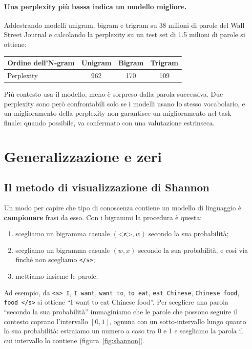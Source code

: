 \paragraph{Una perplexity più bassa indica un modello migliore.} Addestrando modelli unigram, bigram e trigram su 38 milioni di parole del Wall Street Journal e calcolando la perplexity su un test set di 1.5 milioni di parole si ottiene:
\begin{center}
\begin{tabular}{lccc}
\toprule
Ordine dell'N-gram & Unigram & Bigram & Trigram \\
\midrule
Perplexity & 962 & 170 & 109 \\
\bottomrule
\end{tabular}
\end{center}
Più contesto usa il modello, meno è sorpreso dalla parola successiva. Due perplexity sono però confrontabili solo se i modelli usano lo stesso vocabolario, e un miglioramento della perplexity non garantisce un miglioramento nel task finale: quando possibile, va confermato con una valutazione estrinseca.

\section{Generalizzazione e zeri}
\subsection{Il metodo di visualizzazione di Shannon}
Un modo per capire che tipo di conoscenza contiene un modello di linguaggio è \textbf{campionare} frasi da esso. Con i bigrammi la procedura è questa:
\begin{enumerate}
    \item scegliamo un bigramma casuale $(\texttt{<s>}, w)$ secondo la sua probabilità;
    \item scegliamo un bigramma casuale $(w, x)$ secondo la sua probabilità, e così via finché non scegliamo \texttt{</s>};
    \item mettiamo insieme le parole.
\end{enumerate}
Ad esempio, da \texttt{<s> I}, \texttt{I want}, \texttt{want to}, \texttt{to eat}, \texttt{eat Chinese}, \texttt{Chinese food}, \texttt{food </s>} si ottiene \enquote{I want to eat Chinese food}. Per scegliere una parola \enquote{secondo la sua probabilità} immaginiamo che le parole che possono seguire il contesto coprano l'intervallo $[0, 1]$, ognuna con un sotto-intervallo lungo quanto la sua probabilità: estraiamo un numero a caso tra 0 e 1 e scegliamo la parola il cui intervallo lo contiene (figura~\ref{fig:shannon}).


